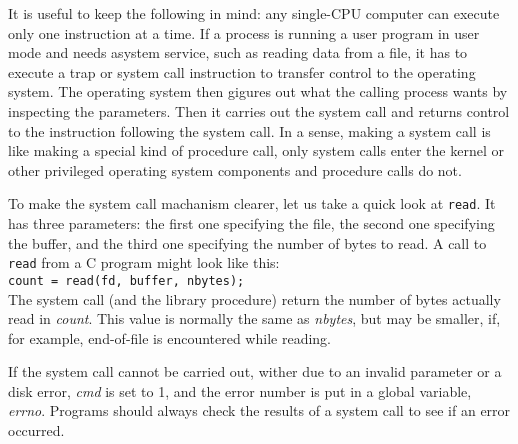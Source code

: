 \documentclass{book}
\newcommand {\sys} [1] {\textsl{#1}}
\newcommand {\cmd} [1] {\texttt{#1}}
\begin{document}
It is useful to keep the following in mind: any single-CPU computer can execute only one instruction at a time.
If a process is running a user program in user mode and needs asystem service, such as reading data from a file, 
it has to execute a trap or system call instruction to transfer control to the operating system.
The operating system then gigures out what the calling process wants by inspecting the parameters.
Then it carries out the system call and returns control to the instruction following the system call.
In a sense, making a system call is like making a special kind of procedure call, 
only system calls enter the kernel or other privileged operating system components and procedure calls do not.

To make the system call machanism clearer, let us take a quick look at \cmd{read}.
It has three parameters: 
the first one specifying the file, the second one specifying the buffer, and the third one specifying the number of bytes to read.
A call to \cmd{read} from a C program might look like this:\\
\cmd{count = read(fd, buffer, nbytes);}\\
The system call (and the library procedure) return the number of bytes actually read in \sys{count}.
This value is normally the same as \sys{nbytes}, but may be smaller, if, for example, end-of-file is encountered while reading.

If the system call cannot be carried out, wither due to an invalid parameter or a disk error, \sys{cmd} is set to 1, 
and the error number is put in a global variable, \sys{errno}.
Programs should always check the results of a system call to see if an error occurred.
\end{document}
